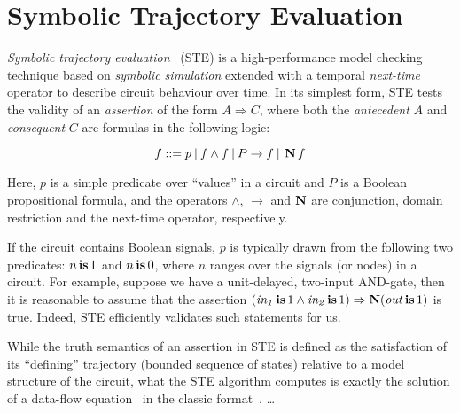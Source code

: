 \section{Symbolic Trajectory Evaluation}


\textit{Symbolic trajectory evaluation}~\cite{seger1995} (STE) is a high-performance model checking technique based on \textit{symbolic simulation} extended with a temporal \textit{next-time} operator to describe circuit behaviour over time. In its simplest form, STE tests the validity of an \textit{assertion} of the form $A \Rightarrow C$, where both the \textit{antecedent} $A$ and \textit{consequent} $C$ are formulas in the following logic:

\begin{equation*}
f ::= p \: | \: f \wedge f \: | \: P \rightarrow f \: | \: \operatorname{\textbf{N}} f
\end{equation*}

\noindent Here, $p$ is a simple predicate over ``values'' in a circuit and $P$ is a Boolean propositional formula, and the operators $\wedge$, $\rightarrow$ and $\operatorname{\textbf{N}}$ are conjunction, domain restriction and the next-time operator, respectively.

If the circuit contains Boolean signals, $p$ is typically drawn from the following two predicates: $n \operatorname{\mathbin{\textbf{is}}} 1$ and $n \operatorname{\mathbin{\textbf{is}}} 0$, where $n$ ranges over the signals (or nodes) in a circuit. For example, suppose we have a unit-delayed, two-input AND-gate, then it is reasonable to assume that the assertion $(\mathit{in_{1}} \operatorname{\mathbin{\textbf{is}}} 1 \wedge \mathit{in_{2}} \operatorname{\mathbin{\textbf{is}}} 1) \Rightarrow \operatorname{\textbf{N}} (\mathit{out} \operatorname{\mathbin{\textbf{is}}} 1)$ is true. Indeed, STE efficiently validates such statements for us.

While the truth semantics of an assertion in STE is defined as the satisfaction of its ``defining'' trajectory (bounded sequence of states) relative to a model structure of the circuit, what the STE algorithm computes is exactly the solution of a data-flow equation~\cite{chou1999} in the classic format~\cite{muchnick1997}. \dots


